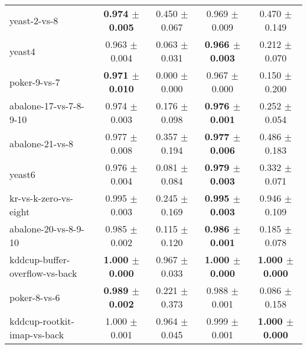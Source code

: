 \begin{table}[!ht]
{\begin{tabular}{l c c c c}
yeast-2-vs-8 & \textbf{0.974 $\pm$ 0.005} & 0.450 $\pm$ 0.067 & 0.969 $\pm$ 0.009 & 0.470 $\pm$ 0.149 \\
yeast4 & 0.963 $\pm$ 0.004 & 0.063 $\pm$ 0.031 & \textbf{0.966 $\pm$ 0.003} & 0.212 $\pm$ 0.070 \\
poker-9-vs-7 & \textbf{0.971 $\pm$ 0.010} & 0.000 $\pm$ 0.000 & 0.967 $\pm$ 0.000 & 0.150 $\pm$ 0.200 \\
abalone-17-vs-7-8-9-10 & 0.974 $\pm$ 0.003 & 0.176 $\pm$ 0.098 & \textbf{0.976 $\pm$ 0.001} & 0.252 $\pm$ 0.054 \\
abalone-21-vs-8 & 0.977 $\pm$ 0.008 & 0.357 $\pm$ 0.194 & \textbf{0.977 $\pm$ 0.006} & 0.486 $\pm$ 0.183 \\
yeast6 & 0.976 $\pm$ 0.004 & 0.081 $\pm$ 0.084 & \textbf{0.979 $\pm$ 0.003} & 0.332 $\pm$ 0.071 \\
kr-vs-k-zero-vs-eight & 0.995 $\pm$ 0.003 & 0.245 $\pm$ 0.169 & \textbf{0.995 $\pm$ 0.003} & 0.946 $\pm$ 0.109 \\
abalone-20-vs-8-9-10 & 0.985 $\pm$ 0.002 & 0.115 $\pm$ 0.120 & \textbf{0.986 $\pm$ 0.001} & 0.185 $\pm$ 0.078 \\
kddcup-buffer-overflow-vs-back & \textbf{1.000 $\pm$ 0.000} & 0.967 $\pm$ 0.033 & \textbf{1.000 $\pm$ 0.000} & \textbf{1.000 $\pm$ 0.000} \\
poker-8-vs-6 & \textbf{0.989 $\pm$ 0.002} & 0.221 $\pm$ 0.373 & 0.988 $\pm$ 0.001 & 0.086 $\pm$ 0.158 \\
kddcup-rootkit-imap-vs-back & 1.000 $\pm$ 0.001 & 0.964 $\pm$ 0.045 & 0.999 $\pm$ 0.001 & \textbf{1.000 $\pm$ 0.000} \\
\end{tabular}}
\end{table}
